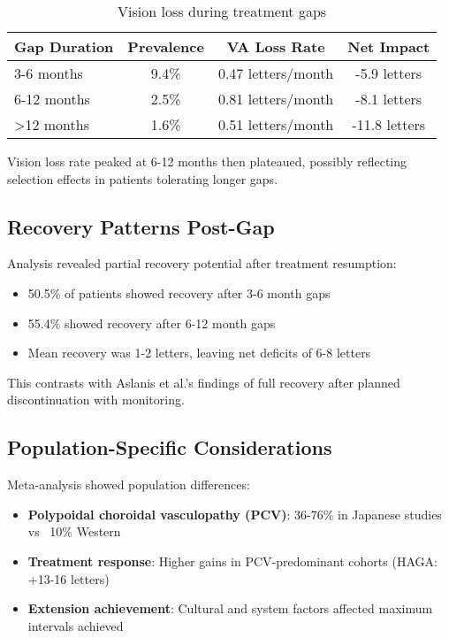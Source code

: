 \begin{table}[h]
\centering
\begin{tabular}{lccc}
\hline
\textbf{Gap Duration} & \textbf{Prevalence} & \textbf{VA Loss Rate} & \textbf{Net Impact} \\
\hline
3-6 months & 9.4\% & 0.47 letters/month & -5.9 letters \\
6-12 months & 2.5\% & 0.81 letters/month & -8.1 letters \\
>12 months & 1.6\% & 0.51 letters/month & -11.8 letters \\
\hline
\end{tabular}
\caption{Vision loss during treatment gaps}
\end{table}

Vision loss rate peaked at 6-12 months then plateaued, possibly reflecting selection effects in patients tolerating longer gaps.

\subsection{Recovery Patterns Post-Gap}

Analysis revealed partial recovery potential after treatment resumption:

\begin{itemize}
    \item 50.5\% of patients showed recovery after 3-6 month gaps
    \item 55.4\% showed recovery after 6-12 month gaps
    \item Mean recovery was 1-2 letters, leaving net deficits of 6-8 letters
\end{itemize}

This contrasts with Aslanis et al.'s findings of full recovery after planned discontinuation with monitoring.

\subsection{Population-Specific Considerations}

Meta-analysis showed population differences:

\begin{itemize}
    \item \textbf{Polypoidal choroidal vasculopathy (PCV)}: 36-76\% in Japanese studies vs ~10\% Western
    \item \textbf{Treatment response}: Higher gains in PCV-predominant cohorts (HAGA: +13-16 letters)
    \item \textbf{Extension achievement}: Cultural and system factors affected maximum intervals achieved
\end{itemize}

